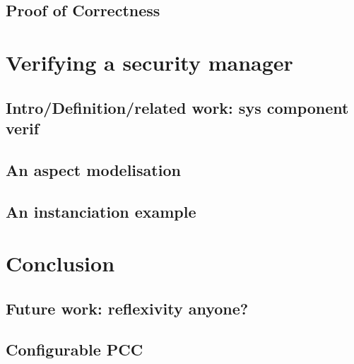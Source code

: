 \documentclass[draft]{llncs}
\begin{document}
\subsection{Proof of Correctness}
%
\section{Verifying a security manager}
\subsection{Intro/Definition/related work: sys component verif}
\subsection{An aspect modelisation}
\subsection{An instanciation example}
\section{Conclusion}
\subsection{Future work: reflexivity anyone?}
\subsection{Configurable PCC}
%
%
\begin{thebibliography}{}
%


\end{thebibliography}
\end{document}
